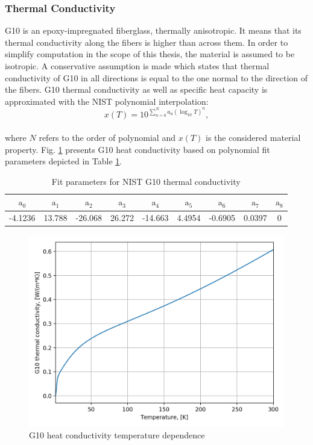 
\subsubsection{Thermal Conductivity}
G10 is an epoxy-impregnated fiberglass, thermally anisotropic. It means that its thermal conductivity along the fibers is higher than across them. In order to simplify computation in the scope of this thesis, the material is assumed to be isotropic. A conservative assumption is made which states that thermal conductivity of G10 in all directions is equal to the one normal to the direction of the fibers.
G10 thermal conductivity as well as specific heat capacity is approximated with the NIST polynomial interpolation:
\begin{equation}
    x(T) = 10^{\sum_{n=0}^{N} a_\text{n}(\log_\text{10}T)^{n}},
\end{equation}
\\
where $N$ refers to the order of polynomial and $x(T)$ is the considered material property. Fig. \ref{fig:g10_k_plot} presents G10 heat conductivity based on polynomial fit parameters depicted in Table \ref{table:nist_g10_k_parameters}.

\begin{table}[h!]
    \caption{Fit parameters for NIST G10 thermal conductivity} 
    \vspace{-1.em} 
    \fontsize{10}{10}
    \selectfont 
    \renewcommand{\arraystretch}{1.5}
    \begin{center}
    \begin{tabular}{ ccccccccc }  
    $\text{a}_0$ & $\text{a}_1$ & $\text{a}_2$ & $\text{a}_3$ & $\text{a}_4$ & $\text{a}_5$ & $\text{a}_6$ & $\text{a}_7$ & $\text{a}_8$ \\
    \hline
    -4.1236 & 13.788 & -26.068 & 26.272 & -14.663 & 4.4954 & -0.6905 & 0.0397 & 0 \\
    \hline 
    \end{tabular}
    \end{center}  
     \label{table:nist_g10_k_parameters} 
 \end{table}
 
  \begin{figure}[h!]
    \centering
    \includegraphics[width=0.49\linewidth]{figures/material_properties/G10_k_plot.png}
    \caption{G10 heat conductivity temperature dependence}
    \label{fig:g10_k_plot}
\end{figure}
 
